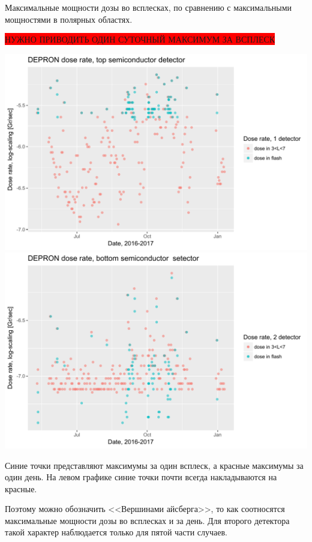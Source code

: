 \documentclass[t, aspectratio=43]{beamer}
\begin{document}
\begin{frame}	
\frametitle{\insertsection} 
Максимальные мощности дозы во всплесках, по сравнению с максимальными мощностями в полярных областях. 

\colorbox{red}{НУЖНО ПРИВОДИТЬ ОДИН СУТОЧНЫЙ МАКСИМУМ ЗА ВСПЛЕСК}
\begin{center}
	\includegraphics[width=0.5\linewidth]{images/dose1flashvsdaymax}
	\includegraphics[width=0.5\linewidth]{images/dose2flashvsdaymax}
\end{center}
{\tiny 
Синие точки представляют максимумы за один всплеск, а красные максимумы за один день. На левом графике синие точки почти всегда накладываются на красные.

Поэтому  можно обозначить <<Вершинами айсберга>>, то как соотносятся максимальные мощности дозы во всплесках и за день. Для второго детектора такой характер наблюдается только для пятой части случаев. }

\end{frame}
\end{document}
